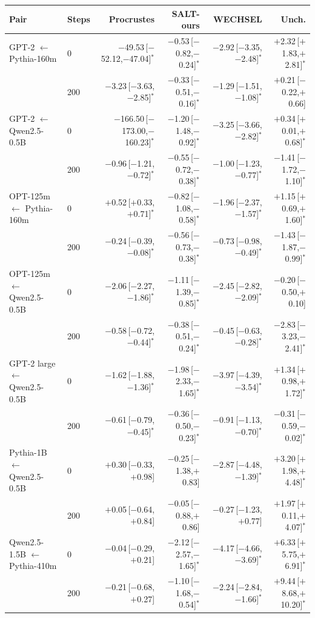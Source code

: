 \begin{tabular}{llrrrr}
\toprule
Pair & Steps & Procrustes & SALT-ours & WECHSEL & Unch. \\
\midrule
GPT-2 $\leftarrow$ Pythia-160m & 0 & $-$49.53\,[$-$52.12,$-$47.04]$^{*}$ & $-$0.53\,[$-$0.82,$-$0.24]$^{*}$ & $-$2.92\,[$-$3.35,$-$2.48]$^{*}$ & $+$2.32\,[$+$1.83,$+$2.81]$^{*}$ \\
 & 200 & $-$3.23\,[$-$3.63,$-$2.85]$^{*}$ & $-$0.33\,[$-$0.51,$-$0.16]$^{*}$ & $-$1.29\,[$-$1.51,$-$1.08]$^{*}$ & $+$0.21\,[$-$0.22,$+$0.66] \\
\addlinespace
GPT-2 $\leftarrow$ Qwen2.5-0.5B & 0 & $-$166.50\,[$-$173.00,$-$160.23]$^{*}$ & $-$1.20\,[$-$1.48,$-$0.92]$^{*}$ & $-$3.25\,[$-$3.66,$-$2.82]$^{*}$ & $+$0.34\,[$+$0.01,$+$0.68]$^{*}$ \\
 & 200 & $-$0.96\,[$-$1.21,$-$0.72]$^{*}$ & $-$0.55\,[$-$0.72,$-$0.38]$^{*}$ & $-$1.00\,[$-$1.23,$-$0.77]$^{*}$ & $-$1.41\,[$-$1.72,$-$1.10]$^{*}$ \\
\addlinespace
OPT-125m $\leftarrow$ Pythia-160m & 0 & $+$0.52\,[$+$0.33,$+$0.71]$^{*}$ & $-$0.82\,[$-$1.08,$-$0.58]$^{*}$ & $-$1.96\,[$-$2.37,$-$1.57]$^{*}$ & $+$1.15\,[$+$0.69,$+$1.60]$^{*}$ \\
 & 200 & $-$0.24\,[$-$0.39,$-$0.08]$^{*}$ & $-$0.56\,[$-$0.73,$-$0.38]$^{*}$ & $-$0.73\,[$-$0.98,$-$0.49]$^{*}$ & $-$1.43\,[$-$1.87,$-$0.99]$^{*}$ \\
\addlinespace
OPT-125m $\leftarrow$ Qwen2.5-0.5B & 0 & $-$2.06\,[$-$2.27,$-$1.86]$^{*}$ & $-$1.11\,[$-$1.39,$-$0.85]$^{*}$ & $-$2.45\,[$-$2.82,$-$2.09]$^{*}$ & $-$0.20\,[$-$0.50,$+$0.10] \\
 & 200 & $-$0.58\,[$-$0.72,$-$0.44]$^{*}$ & $-$0.38\,[$-$0.51,$-$0.24]$^{*}$ & $-$0.45\,[$-$0.63,$-$0.28]$^{*}$ & $-$2.83\,[$-$3.23,$-$2.41]$^{*}$ \\
\addlinespace
GPT-2 large $\leftarrow$ Qwen2.5-0.5B & 0 & $-$1.62\,[$-$1.88,$-$1.36]$^{*}$ & $-$1.98\,[$-$2.33,$-$1.65]$^{*}$ & $-$3.97\,[$-$4.39,$-$3.54]$^{*}$ & $+$1.34\,[$+$0.98,$+$1.72]$^{*}$ \\
 & 200 & $-$0.61\,[$-$0.79,$-$0.45]$^{*}$ & $-$0.36\,[$-$0.50,$-$0.23]$^{*}$ & $-$0.91\,[$-$1.13,$-$0.70]$^{*}$ & $-$0.31\,[$-$0.59,$-$0.02]$^{*}$ \\
\addlinespace
Pythia-1B $\leftarrow$ Qwen2.5-0.5B & 0 & $+$0.30\,[$-$0.33,$+$0.98] & $-$0.25\,[$-$1.38,$+$0.83] & $-$2.87\,[$-$4.48,$-$1.39]$^{*}$ & $+$3.20\,[$+$1.98,$+$4.48]$^{*}$ \\
 & 200 & $+$0.05\,[$-$0.64,$+$0.84] & $-$0.05\,[$-$0.88,$+$0.86] & $-$0.27\,[$-$1.23,$+$0.77] & $+$1.97\,[$+$0.11,$+$4.07]$^{*}$ \\
\addlinespace
Qwen2.5-1.5B $\leftarrow$ Pythia-410m & 0 & $-$0.04\,[$-$0.29,$+$0.21] & $-$2.12\,[$-$2.57,$-$1.65]$^{*}$ & $-$4.17\,[$-$4.66,$-$3.69]$^{*}$ & $+$6.33\,[$+$5.75,$+$6.91]$^{*}$ \\
 & 200 & $-$0.21\,[$-$0.68,$+$0.27] & $-$1.10\,[$-$1.68,$-$0.54]$^{*}$ & $-$2.24\,[$-$2.84,$-$1.66]$^{*}$ & $+$9.44\,[$+$8.68,$+$10.20]$^{*}$ \\
\bottomrule
\end{tabular}
